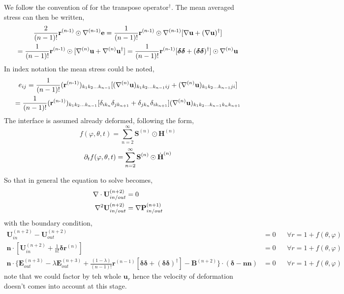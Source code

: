 We follow the convention of \citet{brenner1963stokes} for the transpose operator$^\dagger$. 
The mean averaged stress can then be written, 
\begin{multline}
    \frac{2}{(n-1)!}\textbf{r}^\text{($n$-1)}\odot \mathbf{\nabla}^\text{($n$-1)}\textbf{e}
    =
    \frac{1}{(n-1)!}\textbf{r}^\text{($n$-1)}\odot \mathbf{\nabla}^\text{($n$-1)}[\mathbf{\nabla} \textbf{u}+ (\mathbf{\nabla} \textbf{u})^\dagger]\\
    =
    \frac{1}{(n-1)!}\textbf{r}^\text{($n$-1)}\odot [\mathbf{\nabla}^{(n)}\textbf{u} + \mathbf{\nabla}^{(n)}\textbf{u}^\dagger]
    =
    \frac{1}{(n-1)!}\textbf{r}^\text{($n$-1)}[\bm\delta\bm\delta + (\bm\delta\bm\delta)^\dagger] \odot \mathbf{\nabla}^{(n)}\textbf{u}
\end{multline}
In index notation the mean stress could be noted, 
\begin{multline}
    e_{ij}
    =
    \frac{1}{(n-1)!}(\textbf{r}^\text{($n$-1)})_{k_1k_2\ldots k_{n-1}} 
    [(\mathbf{\nabla}^{(n)}\textbf{u})_{k_1k_2\ldots k_{n-1}ij}  + (\mathbf{\nabla}^{(n)}\textbf{u})_{k_1k_2\ldots k_{n-1}ji}]\\
    =
    \frac{1}{(n-1)!}(\textbf{r}^\text{($n$-1)})_{k_1k_2\ldots k_{n-1}} 
    [\delta_{ik_n} \delta_{jk_{n+1}}+ \delta_{jk_n} \delta_{ik_{n+1}}]
    (\mathbf{\nabla}^{(n)}\textbf{u})_{k_1k_2\ldots k_{n-1}k_nk_{n+1}} 
\end{multline}
The interface is assumed already deformed, following the form, 
\begin{equation}
    f(\varphi,\theta,t) =  \sum_{n=2}^{\infty} \textbf{S}^{(n)}\odot \textbf{H}^{(n)}
\end{equation}
\begin{equation}
   \partial_t  f(\varphi,\theta,t) =  \sum_{n=2}^{\infty} \textbf{S}^{(n)}\odot \dot{\textbf{H}}^{(n)}
\end{equation}

So that in general the equation to solve becomes, 
\begin{align*}
    \mathbf{\nabla}\cdot \textbf{U}_{in/out}^{(n+2)} &= 0 \\
    \mathbf{\nabla}^2\textbf{U}_{in/out}^{(n+2)} &= \mathbf{\nabla} \textbf{P}_{in/out}^{(n+1)} \\
\end{align*}
with the boundary condition, 
\begin{align}
    \textbf{U}_{in}^{(n+2)} - \textbf{U}_{out}^{(n+2)}
    &=
    0
    &&\forall r = 1 + f(\theta,\varphi)
    \\
    \textbf{n}\cdot [\textbf{U}_{in}^{(n+2)} 
    +\frac{1}{n!}\bm\delta \textbf{r}^{(n)}] &= 0 
    &&\forall r = 1 + f(\theta,\varphi)\\
    \textbf{n}\cdot \{
        \textbf{E}_{out}^{(n+3)}
        -\lambda\textbf{E}_{out}^{(n+3)}
        +\frac{(1-\lambda)}{(n-1)!}
        \textbf{r}^{(n-1)}[\bm\delta\bm\delta + (\bm\delta\bm\delta)^\dagger]
        - \textbf{B}^{(n+2)}
    \}\cdot (\bm\delta - \textbf{nn})
    &=
    0
    &&\forall r = 1 + f(\theta,\varphi)
\end{align}
note that we could factor by teh whole $\textbf{u}_r$ hence the velocity of deformation doesn't comes into account at this stage. 

